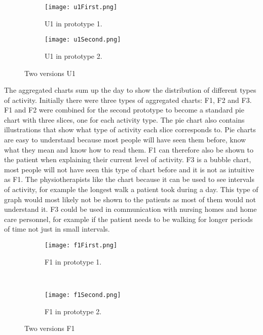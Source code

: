 \begin{figure}[h!]
  \centering
  \begin{subfigure}[b]{0.49\textwidth}
    \centering
    \texttt{[image: u1First.png]}
    \caption{\footnotesize U1 in prototype 1.}
  \end{subfigure}
  \begin{subfigure}[b]{0.29\textwidth}
    \centering
    \texttt{[image: u1Second.png]}
    \caption{\footnotesize U1 in prototype 2.}
  \end{subfigure} 
  \caption{Two versions U1}
  \label{fig:uComparison}
\end{figure}

The aggregated charts sum up the day to show the distribution of different types of activity. Initially there were three types of aggregated charts: F1, F2 and F3. F1 and F2 were combined for the second prototype to become a standard pie chart with three slices, one for each activity type. The pie chart also contains illustrations that show what type of activity each slice corresponds to. Pie charts are easy to understand because most people will have seen them before, know what they mean and know how to read them. F1 can therefore also be shown to the patient when explaining their current level of activity. F3 is a bubble chart, most people will not have seen this type of chart before and it is not as intuitive as F1. The physiotherapists like the chart because it can be used to see intervals of activity, for example the longest walk a patient took during a day. This type of graph would most likely not be shown to the patients as most of them would not understand it. F3 could be used in communication with nursing homes and home care personnel, for example if the patient needs to be walking for longer periods of time not just in small intervals. 

\begin{figure}[h!]
  \centering
  \begin{subfigure}[b]{1\textwidth}
    \centering
    \texttt{[image: f1First.png]}
    \caption{\footnotesize F1 in prototype 1.}
  \end{subfigure}
  \\
  \begin{subfigure}[b]{0.6\textwidth}
    \centering
    \texttt{[image: f1Second.png]}
    \caption{\footnotesize F1 in prototype 2.}
  \end{subfigure} 
  \caption{Two versions F1}
  \label{fig:fComparison}
\end{figure} 

